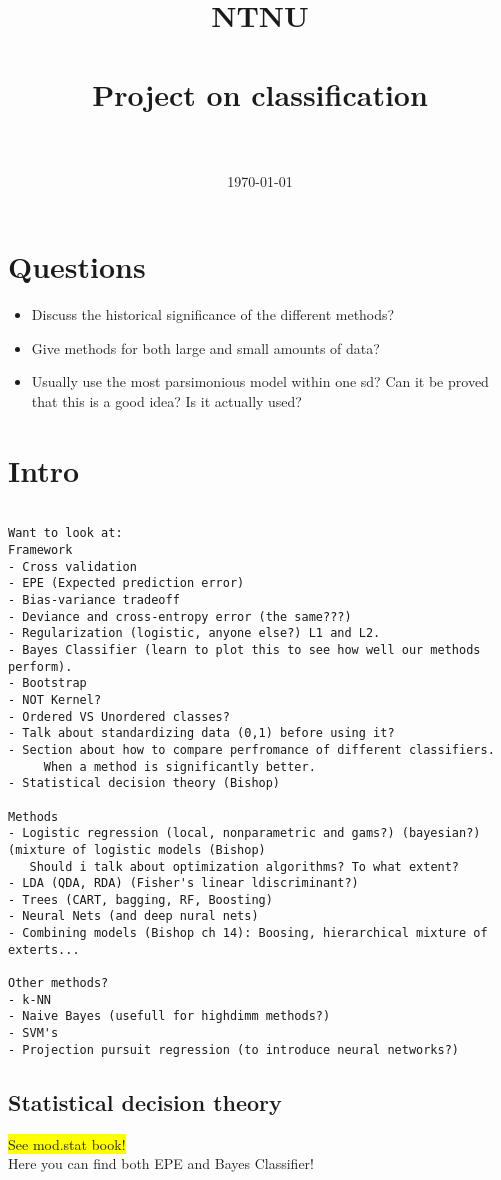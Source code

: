 \documentclass[11pt,a4paper]{article}
\title{	
\normalfont \normalsize 
\textsc{NTNU} \\ [25pt] %
\horrule{0.5pt} \\[0.4cm] %
\huge Project on classification \\ %
\horrule{2pt} \\[0.5cm] %
}
\author{\AuthorName } %
\date{\normalsize\today} %
\begin{document}
\maketitle
\listoftodos{}
%
\section{Questions}
\label{sec:Questions...}
\begin{itemize}
  \item Discuss the historical significance of the different methods?
  \item Give methods for both large and small amounts of data?
  \item Usually use the most parsimonious model within one sd? Can it be proved that this is a good idea? Is it actually used?
\end{itemize}
%
\section{Intro}
\label{sec:Intro}
\begin{verbatim}
  
Want to look at:
Framework
- Cross validation 
- EPE (Expected prediction error)
- Bias-variance tradeoff 
- Deviance and cross-entropy error (the same???)
- Regularization (logistic, anyone else?) L1 and L2.
- Bayes Classifier (learn to plot this to see how well our methods perform).
- Bootstrap
- NOT Kernel?
- Ordered VS Unordered classes?
- Talk about standardizing data (0,1) before using it?
- Section about how to compare perfromance of different classifiers.
     When a method is significantly better.
- Statistical decision theory (Bishop)

Methods
- Logistic regression (local, nonparametric and gams?) (bayesian?) (mixture of logistic models (Bishop)
   Should i talk about optimization algorithms? To what extent?
- LDA (QDA, RDA) (Fisher's linear ldiscriminant?)
- Trees (CART, bagging, RF, Boosting) 
- Neural Nets (and deep nural nets)
- Combining models (Bishop ch 14): Boosing, hierarchical mixture of exterts...

Other methods?
- k-NN
- Naive Bayes (usefull for highdimm methods?)
- SVM's
- Projection pursuit regression (to introduce neural networks?)
\end{verbatim}
%
%

%
\subsection{Statistical decision theory}
\label{sub:Statistical desicion theory}
\colorbox{yellow}{See mod.stat book!} \\
Here you can find both EPE and Bayes Classifier!
\end{document}

